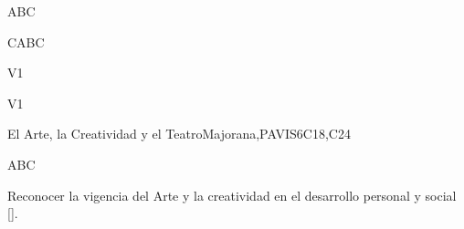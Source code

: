 \begin{syllabus}


\begin{justification}
ABC
\end{justification}

\begin{goals}
\item CABC
\end{goals}

\begin{outcomes}{V1}
    \item {}
    \item {}
\end{outcomes}

\begin{competences}{V1}
    \item {}
    \item {}
    \item {}
\end{competences}

\begin{unit}{}{El Arte, la Creatividad y el Teatro}{Majorana,PAVIS}{6}{C18,C24}
\begin{topics}
	\item ABC
\end{topics}
\begin{learningoutcomes}
	\item Reconocer la vigencia del Arte y la creatividad en el desarrollo personal y social [\Usage].
	
\end{learningoutcomes}
\end{unit}

\begin{coursebibliography}
\end{coursebibliography}

\end{syllabus}
